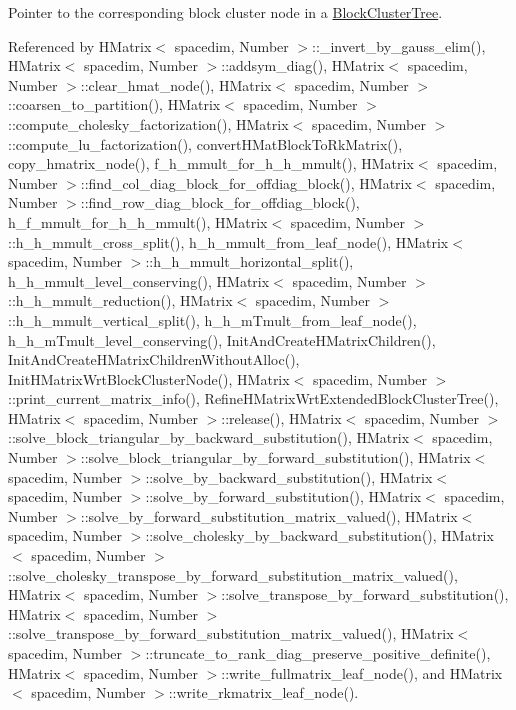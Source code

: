 Pointer to the corresponding block cluster node in a \hyperlink{classBlockClusterTree}{Block\+Cluster\+Tree}. 

Referenced by H\+Matrix$<$ spacedim, Number $>$\+::\+\_\+invert\+\_\+by\+\_\+gauss\+\_\+elim(), H\+Matrix$<$ spacedim, Number $>$\+::addsym\+\_\+diag(), H\+Matrix$<$ spacedim, Number $>$\+::clear\+\_\+hmat\+\_\+node(), H\+Matrix$<$ spacedim, Number $>$\+::coarsen\+\_\+to\+\_\+partition(), H\+Matrix$<$ spacedim, Number $>$\+::compute\+\_\+cholesky\+\_\+factorization(), H\+Matrix$<$ spacedim, Number $>$\+::compute\+\_\+lu\+\_\+factorization(), convert\+H\+Mat\+Block\+To\+Rk\+Matrix(), copy\+\_\+hmatrix\+\_\+node(), f\+\_\+h\+\_\+mmult\+\_\+for\+\_\+h\+\_\+h\+\_\+mmult(), H\+Matrix$<$ spacedim, Number $>$\+::find\+\_\+col\+\_\+diag\+\_\+block\+\_\+for\+\_\+offdiag\+\_\+block(), H\+Matrix$<$ spacedim, Number $>$\+::find\+\_\+row\+\_\+diag\+\_\+block\+\_\+for\+\_\+offdiag\+\_\+block(), h\+\_\+f\+\_\+mmult\+\_\+for\+\_\+h\+\_\+h\+\_\+mmult(), H\+Matrix$<$ spacedim, Number $>$\+::h\+\_\+h\+\_\+mmult\+\_\+cross\+\_\+split(), h\+\_\+h\+\_\+mmult\+\_\+from\+\_\+leaf\+\_\+node(), H\+Matrix$<$ spacedim, Number $>$\+::h\+\_\+h\+\_\+mmult\+\_\+horizontal\+\_\+split(), h\+\_\+h\+\_\+mmult\+\_\+level\+\_\+conserving(), H\+Matrix$<$ spacedim, Number $>$\+::h\+\_\+h\+\_\+mmult\+\_\+reduction(), H\+Matrix$<$ spacedim, Number $>$\+::h\+\_\+h\+\_\+mmult\+\_\+vertical\+\_\+split(), h\+\_\+h\+\_\+m\+Tmult\+\_\+from\+\_\+leaf\+\_\+node(), h\+\_\+h\+\_\+m\+Tmult\+\_\+level\+\_\+conserving(), Init\+And\+Create\+H\+Matrix\+Children(), Init\+And\+Create\+H\+Matrix\+Children\+Without\+Alloc(), Init\+H\+Matrix\+Wrt\+Block\+Cluster\+Node(), H\+Matrix$<$ spacedim, Number $>$\+::print\+\_\+current\+\_\+matrix\+\_\+info(), Refine\+H\+Matrix\+Wrt\+Extended\+Block\+Cluster\+Tree(), H\+Matrix$<$ spacedim, Number $>$\+::release(), H\+Matrix$<$ spacedim, Number $>$\+::solve\+\_\+block\+\_\+triangular\+\_\+by\+\_\+backward\+\_\+substitution(), H\+Matrix$<$ spacedim, Number $>$\+::solve\+\_\+block\+\_\+triangular\+\_\+by\+\_\+forward\+\_\+substitution(), H\+Matrix$<$ spacedim, Number $>$\+::solve\+\_\+by\+\_\+backward\+\_\+substitution(), H\+Matrix$<$ spacedim, Number $>$\+::solve\+\_\+by\+\_\+forward\+\_\+substitution(), H\+Matrix$<$ spacedim, Number $>$\+::solve\+\_\+by\+\_\+forward\+\_\+substitution\+\_\+matrix\+\_\+valued(), H\+Matrix$<$ spacedim, Number $>$\+::solve\+\_\+cholesky\+\_\+by\+\_\+backward\+\_\+substitution(), H\+Matrix$<$ spacedim, Number $>$\+::solve\+\_\+cholesky\+\_\+transpose\+\_\+by\+\_\+forward\+\_\+substitution\+\_\+matrix\+\_\+valued(), H\+Matrix$<$ spacedim, Number $>$\+::solve\+\_\+transpose\+\_\+by\+\_\+forward\+\_\+substitution(), H\+Matrix$<$ spacedim, Number $>$\+::solve\+\_\+transpose\+\_\+by\+\_\+forward\+\_\+substitution\+\_\+matrix\+\_\+valued(), H\+Matrix$<$ spacedim, Number $>$\+::truncate\+\_\+to\+\_\+rank\+\_\+diag\+\_\+preserve\+\_\+positive\+\_\+definite(), H\+Matrix$<$ spacedim, Number $>$\+::write\+\_\+fullmatrix\+\_\+leaf\+\_\+node(), and H\+Matrix$<$ spacedim, Number $>$\+::write\+\_\+rkmatrix\+\_\+leaf\+\_\+node().

